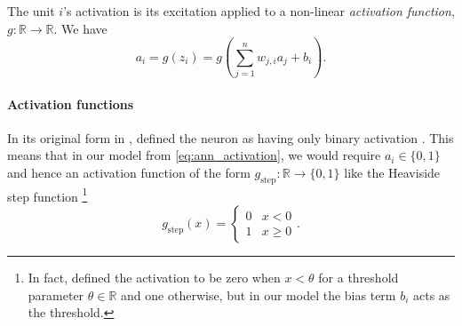 \documentclass[../main.tex]{subfiles}
\begin{document}
The unit $i$'s activation is its excitation applied to a non-linear \emph{activation function}, $g: \mathbb{R} \rightarrow \mathbb{R}$. We have
\begin{equation}
    \label{eq:ann_activation}
    a_i = g\left(z_i\right) = g\left(\sum_{j=1}^n{w_{j,i} a_j} + b_i\right).
\end{equation}

\paragraph{Activation functions}
In its original form in \citeyear{mcculloch1943}, \citeauthor{mcculloch1943} defined the neuron as having only binary activation \cite*{mcculloch1943}. 
This means that in our model from \cref{eq:ann_activation}, we would require $a_i \in \{0, 1\}$ and hence an activation function of the form $g_\text{step}: \mathbb{R} \rightarrow \{0, 1\}$ like the Heaviside step function%
\footnote{In fact, \citeauthor{mcculloch1943} defined the activation to be zero when $x<\theta$ for a threshold parameter $\theta \in \mathbb{R}$ and one otherwise, but in our model the bias term $b_i$ acts as the threshold.}
\begin{equation*}
    \label{eq:step_activation}
    g_\text{step}(x) = \begin{cases} 
        0 & x < 0 \\
        1 & x \geq 0
    \end{cases}.
\end{equation*}
\end{document}
